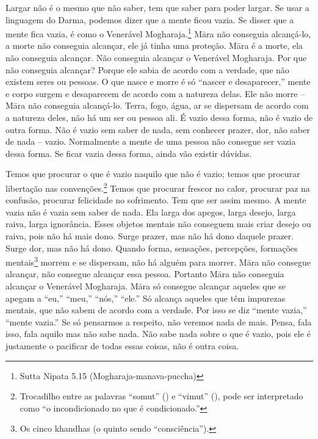 Largar não é o mesmo que não saber, tem que saber para poder largar.
Se usar a linguagem do Darma, podemos dizer que a mente ficou vazia. Se
disser que a mente fica vazia, é como o Venerável
Mogharaja.\footnote{Sutta Nipata 5.15 (Mogharaja-manava-puccha)} Māra
não conseguia alcançá-lo, a morte não conseguia alcançar, ele já tinha
uma proteção. Māra é a morte, ela não conseguia alcançar. Não
conseguia alcançar o Venerável Mogharaja. Por que não conseguia
alcançar? Porque ele sabia de acordo com a verdade, que não existem
seres ou pessoas. O que nasce e morre é só “nascer e desaparecer,”
mente e corpo surgem e desaparecem de acordo com a natureza delas. Ele
não morre – Māra não conseguia alcançá-lo. Terra, fogo, água, ar se
dispersam de acordo com a natureza deles, não há um ser ou pessoa ali.
É vazio dessa forma, não é vazio de outra forma. Não é vazio sem saber
de nada, sem conhecer prazer, dor, não saber de nada – vazio.
Normalmente a mente de uma pessoa não consegue ser vazia dessa forma.
Se ficar vazia dessa forma, ainda vão existir dúvidas. 

Temos que procurar o que é vazio naquilo que não é vazio; temos que
procurar libertação nas convenções.\footnote{Trocadilho entre as
palavras “somut” () e “vimut”
(), pode ser interpretado como “o
incondicionado no que é condicionado.”} Temos que procurar frescor no
calor, procurar paz na confusão, procurar felicidade no sofrimento. Tem
que ser assim mesmo. A mente vazia não é vazia sem saber de nada. Ela
larga dos apegos, larga desejo, larga raiva, larga ignorância. Esses
objetos mentais não conseguem mais criar desejo ou raiva, pois não há
mais dono. Surge prazer, mas não há dono daquele prazer. Surge dor, mas
não há dono. Quando forma, sensações, percepções, formações
mentais\footnote{Os cinco khandhas (o quinto sendo “consciência”).}
morrem e se dispersam, não há alguém para morrer. Māra não consegue
alcançar, não consegue alcançar essa pessoa. Portanto Māra não
conseguia alcançar o Venerável Mogharaja. Māra só consegue alcançar
aqueles que se apegam a “eu,” “meu,” “nós,” “ele.” Só alcança aqueles
que têm impurezas mentais, que não sabem de acordo com a verdade. Por
isso se diz “mente vazia,” “mente vazia.” Se só pensarmos a respeito,
não veremos nada de mais. Pensa, fala isso, fala aquilo mas não sabe
nada. Não sabe nada sobre o que é vazio, pois ele é justamente o
pacificar de todas essas coisas, não é outra coisa. 

